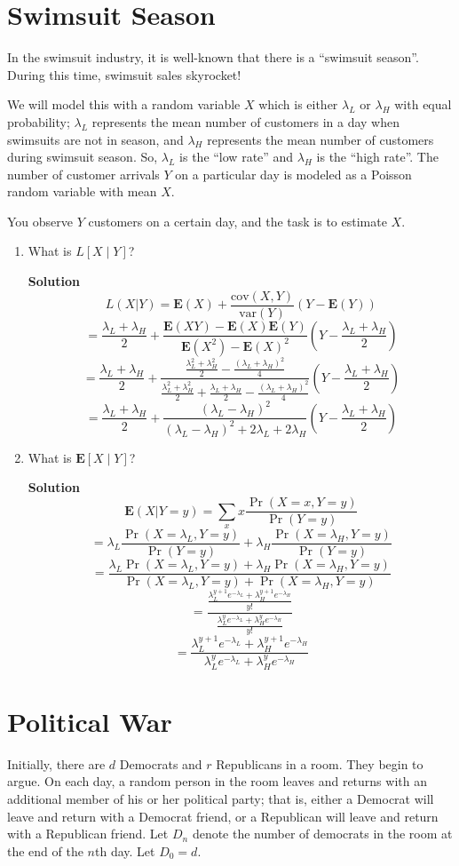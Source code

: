 \documentclass[11pt]{article}
\newcommand*{\Question}[1]{\section{#1}}
\newenvironment{Parts}{\begin{enumerate}[label=(\alph*)]}{\end{enumerate}}
\newcommand*{\Part}{\item}
\newenvironment{Answer}{\vspace{10pt}\begin{mdframed}\textbf{Solution}\\}{\end{mdframed}\vfill\pagebreak[3]}
\newenvironment{Answer}{\vspace{10pt}}{\vfill\pagebreak[3]}
\newcommand*{\E}{\textbf{E}}
\newcommand*{\var}[1]{\text{var}(#1)}
\newcommand*{\cov}[1]{\text{cov}(#1)}
\begin{document}
\Question{Swimsuit Season}

In the swimsuit industry, it is well-known that there is a ``swimsuit season''. During this time, swimsuit sales skyrocket!

We will model this with a random variable $X$ which is either $\lambda_L$ or $\lambda_H$ with equal probability; $\lambda_L$ represents the mean number of customers in a day when swimsuits are not in season, and $\lambda_H$ represents the mean number of customers during swimsuit season. So, $\lambda_L$ is the ``low rate'' and $\lambda_H$ is the ``high rate''. The number of customer arrivals $Y$ on a particular day is modeled as a Poisson random variable with mean $X$.

You observe $Y$ customers on a certain day, and the task is to estimate $X$.

\begin{Parts}    
  \Part What is $L[X \mid Y]$?
  \begin{Answer}
    $$L(X|Y)=\E(X)+\frac{\cov{X,Y}}{\var{Y}}(Y-\E(Y))$$
    $$=\frac{\lambda_L+\lambda_H}{2}+\frac{\E(XY)-\E(X)\E(Y)}{\E(X^2)-\E(X)^2}(Y-\frac{\lambda_L+\lambda_H}{2})$$
    $$=\frac{\lambda_L+\lambda_H}{2}+\frac{\frac{\lambda_L^2+\lambda_H^2}{2}-\frac{(\lambda_L+\lambda_H)^2}{4}}{\frac{\lambda_L^2+\lambda_H^2}{2}+\frac{\lambda_L+\lambda_H}{2}-\frac{(\lambda_L+\lambda_H)^2}{4}}(Y-\frac{\lambda_L+\lambda_H}{2})$$
    $$=\frac{\lambda_L+\lambda_H}{2}+\frac{(\lambda_L-\lambda_H)^2}{(\lambda_L-\lambda_H)^2+2\lambda_L+2\lambda_H}(Y-\frac{\lambda_L+\lambda_H}{2})$$
    
  \end{Answer}

  \Part What is $\E[X \mid Y]$?
  \begin{Answer}
    $$\E(X|Y=y)=\sum_xx\frac{\Pr(X=x,Y=y)}{\Pr(Y=y)}$$
    $$=\lambda_L\frac{\Pr(X=\lambda_L,Y=y)}{\Pr(Y=y)}+\lambda_H\frac{\Pr(X=\lambda_H,Y=y)}{\Pr(Y=y)}$$
    $$=\frac{\lambda_L\Pr(X=\lambda_L,Y=y)+\lambda_H\Pr(X=\lambda_H,Y=y)}{\Pr(X=\lambda_L,Y=y)+\Pr(X=\lambda_H,Y=y)}$$
    $$=\frac{\frac{\lambda_L^{y+1}e^{-\lambda_L}+\lambda_H^{y+1}e^{-\lambda_H}}{y!}}{\frac{\lambda_L^ye^{-\lambda_L}+\lambda_H^ye^{-\lambda_H}}{y!}}$$
    $$=\frac{\lambda_L^{y+1}e^{-\lambda_L}+\lambda_H^{y+1}e^{-\lambda_H}}{\lambda_L^{y}e^{-\lambda_L}+\lambda_H^{y}e^{-\lambda_H}}$$
  \end{Answer}  
\end{Parts}


\Question{Political War}

Initially, there are $d$ Democrats and $r$ Republicans in a room. They begin to argue. On each day, a random person in the room leaves and returns with an additional member of his or her political party; that is, either a Democrat will leave and return with a Democrat friend, or a Republican will leave and return with a Republican friend. Let $D_n$ denote the number of democrats in the room at the end of the $n$th day. Let $D_0 = d$.
\end{document}

